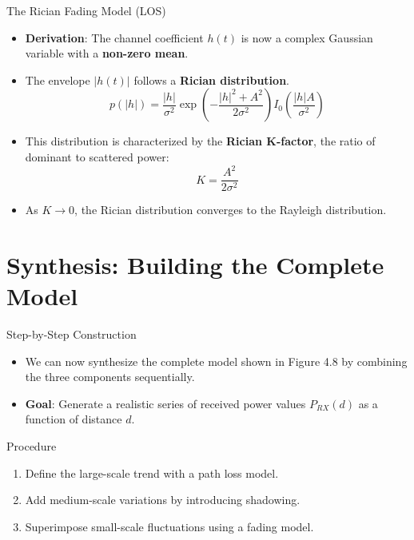 \documentclass{beamer}
\begin{document}
	\begin{frame}{The Rician Fading Model (LOS)}
		\begin{itemize}
			\item \textbf{Derivation}: The channel coefficient $h(t)$ is now a complex Gaussian variable with a \textbf{non-zero mean}.
			\item The envelope $|h(t)|$ follows a \textbf{Rician distribution}.
			\[ p(|h|) = \frac{|h|}{\sigma^2} \exp\left(-\frac{|h|^2 + A^2}{2\sigma^2}\right) I_0\left(\frac{|h|A}{\sigma^2}\right) \]
			\item This distribution is characterized by the \textbf{Rician K-factor}, the ratio of dominant to scattered power:
			\[ K = \frac{A^2}{2\sigma^2} \]
			\item As $K \to 0$, the Rician distribution converges to the Rayleigh distribution.
		\end{itemize}
	\end{frame}
	
	\section{Synthesis: Building the Complete Model}
	
	\begin{frame}{Step-by-Step Construction}
		\begin{itemize}
			\item We can now synthesize the complete model shown in Figure 4.8 by combining the three components sequentially.
			\item \textbf{Goal}: Generate a realistic series of received power values $P_{RX}(d)$ as a function of distance $d$.
		\end{itemize}
		\begin{block}{Procedure}
			\begin{enumerate}
				\item Define the large-scale trend with a path loss model.
				\item Add medium-scale variations by introducing shadowing.
				\item Superimpose small-scale fluctuations using a fading model.
			\end{enumerate}
		\end{block}
	\end{frame}
	
\end{document}

